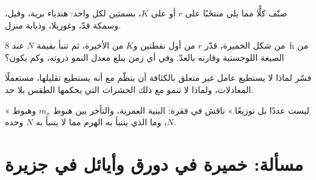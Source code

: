 \begin{exercise}[$\star\star$]\label{exo:b1:populations:9}
صنّف كلًّا مما يلي منتخَبًا على $r$ أو على $K$، بسمتين لكل واحد:
هندباء برية، وفيل، وسمكة قدّ، وغوريلا، وذبابة منزل.
\end{exercise}

\begin{exercise}[$\star\star\star$]\label{exo:b1:populations:10}
من شكل الخميرة، قدّر $r$ من أول نقطتين و$K$ من الأخيرة، ثم تنبأ
بقيمة $N$ عند \qty{8}{h} من الصيغة اللوجستية وقارنه بالعدّ. وفي أي
زمن يبلغ معدل النمو ذروته، وكم يكون؟
\end{exercise}

\begin{exercise}[$\star\star\star$]\label{exo:b1:populations:11}
فسّر لماذا لا يستطيع عامل غير متعلق بالكثافة أن ينظّم  مع
أنه يستطيع تقليلها، مستعملًا المعادلات، ولماذا لا تنمو مع ذلك
 الحشرات التي يحكمها الطقس بلا حد.
\end{exercise}

\begin{exercise}[$\star\star\star$]\label{exo:b1:populations:12}
« ليست عددًا بل توزيعًا.» ناقش في فقرة: البنية العمرية،
والتأخر بين هبوط $m_x$ وهبوط $N$، وما الذي يتنبأ به الهرم مما لا
يتنبأ به $N$ وحده.
\end{exercise}

\section{مسألة: خميرة في دورق وأيائل في جزيرة}

